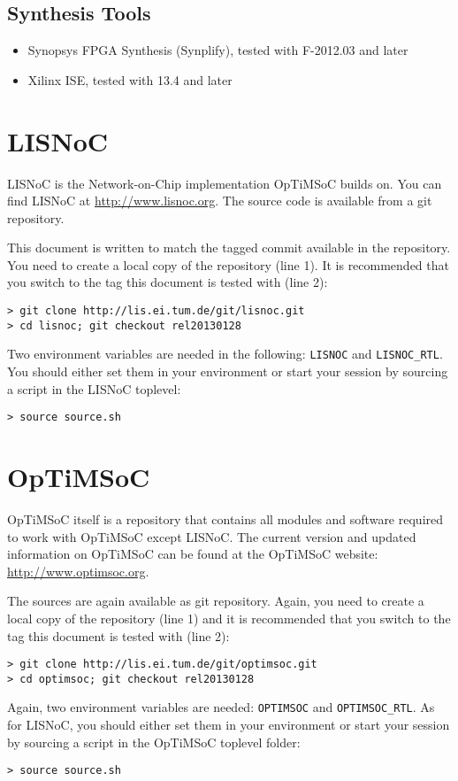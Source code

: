 \subsection{Synthesis Tools}

\begin{itemize}
\item Synopsys FPGA Synthesis (Synplify), tested with F-2012.03 and
  later
\item Xilinx ISE, tested with 13.4 and later
\end{itemize}

\section{LISNoC}

LISNoC is the Network-on-Chip implementation OpTiMSoC builds on. You
can find LISNoC at \url{http://www.lisnoc.org}. The source code is
available from a git repository.

This document is written to match the tagged commit available in the
repository. You need to create a local copy of the repository (line
1). It is recommended that you switch to the tag this document is
tested with (line 2):

\begin{verbatim}
> git clone http://lis.ei.tum.de/git/lisnoc.git
> cd lisnoc; git checkout rel20130128
\end{verbatim}

Two environment variables are needed in the following: \verb|LISNOC|
and \verb|LISNOC_RTL|. You should either set them in your environment
or start your session by sourcing a script in the LISNoC toplevel:

\begin{verbatim}
> source source.sh
\end{verbatim}

\section{OpTiMSoC}

OpTiMSoC itself is a repository that contains all modules and software
required to work with OpTiMSoC except LISNoC. The current version and
updated information on OpTiMSoC can be found at the OpTiMSoC website:
\url{http://www.optimsoc.org}.

The sources are again available as git repository. Again, you need to
create a local copy of the repository (line 1) and it is recommended that
you switch to the tag this document is tested with (line 2):

\begin{verbatim}
> git clone http://lis.ei.tum.de/git/optimsoc.git
> cd optimsoc; git checkout rel20130128
\end{verbatim}

Again, two environment variables are needed: \verb|OPTIMSOC| and
\verb|OPTIMSOC_RTL|. As for LISNoC, you should either set them in your
environment or start your session by sourcing a script in the OpTiMSoC
toplevel folder:

\begin{verbatim}
> source source.sh
\end{verbatim}
